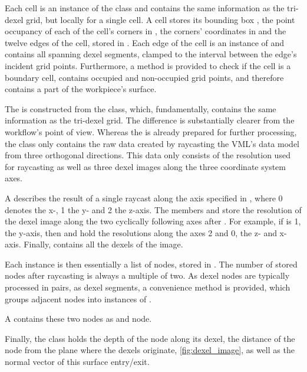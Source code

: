 Each cell is an instance of the  class and contains the same information as the tri-dexel grid, but locally for a single cell.
A cell stores its bounding box , the point occupancy of each of the cell's corners in , the corners' coordinates in  and the twelve edges of the cell, stored in .
Each edge of the cell is an instance of  and contains all spanning dexel segments, clamped to the interval between the edge's incident grid points.
Furthermore, a method  is provided to check if the cell is a boundary cell, \ie contains occupied and non-occupied grid points, and therefore contains a part of the workpiece's surface.

The  is constructed from the  class, which, fundamentally, contains the same information as the tri-dexel grid.
The difference is substantially clearer from the workflow's point of view.
Whereas the  is already prepared for further processing, the  class only contains the raw data created by raycasting the VML's data model from three orthogonal directions.
This data only consists of the resolution  used for raycasting as well as three dexel images  along the three coordinate system axes.

A  describes the result of a single raycast along the axis specified in , where 0 denotes the x-, 1 the y- and 2 the z-axis.
The members  and  store the resolution of the dexel image along the two cyclically following axes after .
For example, if  is 1, the y-axis, then  and  hold the resolutions along the axes 2 and 0, the z- and x-axis.
Finally,  contains all the dexels of the image.

Each  instance is then essentially a list of nodes, stored in .
The number of stored nodes after raycasting is always a multiple of two.
As dexel nodes are typically processed in pairs, as dexel segments, a convenience method  is provided, which groups adjacent nodes into instances of .

A  contains these two nodes as  and  node.

Finally, the  class holds the depth of the node along its dexel, \ie the distance of the node from the plane where the dexels originate, \cf \cref{fig:dexel_image}, as well as the normal vector of this surface entry/exit.

